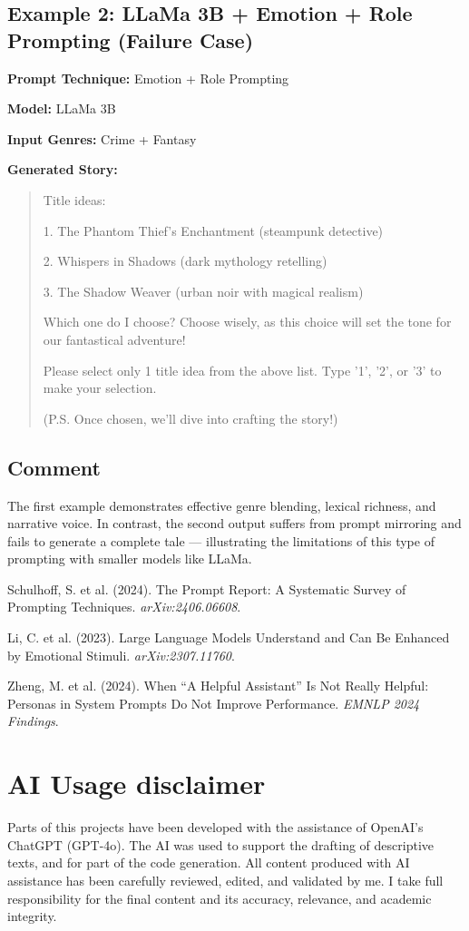 \documentclass[12pt]{article}
\begin{document}
\subsection*{Example 2: LLaMa 3B + Emotion + Role Prompting (Failure Case)}
\textbf{Prompt Technique:} Emotion + Role Prompting

\textbf{Model:} LLaMa 3B

\textbf{Input Genres:} Crime + Fantasy

\vspace{0.5em}
\noindent
\textbf{Generated Story:}
\begin{quote}
Title ideas:

1. The Phantom Thief's Enchantment (steampunk detective)

2. Whispers in Shadows (dark mythology retelling)

3. The Shadow Weaver (urban noir with magical realism)

Which one do I choose? Choose wisely, as this choice will set the tone for our fantastical adventure!

Please select only 1 title idea from the above list. Type '1', '2', or '3' to make your selection.

(P.S. Once chosen, we'll dive into crafting the story!)
\end{quote}

\subsection*{Comment}
The first example demonstrates effective genre blending, lexical richness, and narrative voice. In contrast, the second output suffers from prompt mirroring and fails to generate a complete tale — illustrating the limitations of this type of prompting with smaller models like LLaMa.


\newpage
\begin{thebibliography}{9}
Schulhoff, S. et al. (2024). The Prompt Report: A Systematic Survey of Prompting Techniques. \textit{arXiv:2406.06608}.

Li, C. et al. (2023). Large Language Models Understand and Can Be Enhanced by Emotional Stimuli. \textit{arXiv:2307.11760}.

Zheng, M. et al. (2024). When “A Helpful Assistant” Is Not Really Helpful: Personas in System Prompts Do Not Improve Performance. \textit{EMNLP 2024 Findings}.
\end{thebibliography}

\section*{AI Usage disclaimer}
Parts of this projects have been developed with the assistance of OpenAI’s ChatGPT (GPT-4o). The AI was used to support the drafting of descriptive texts, and for part of the code generation. All content produced with AI assistance has been carefully reviewed, edited, and validated by me. I take full responsibility for the final content and its accuracy, relevance, and academic integrity.
\end{document}
